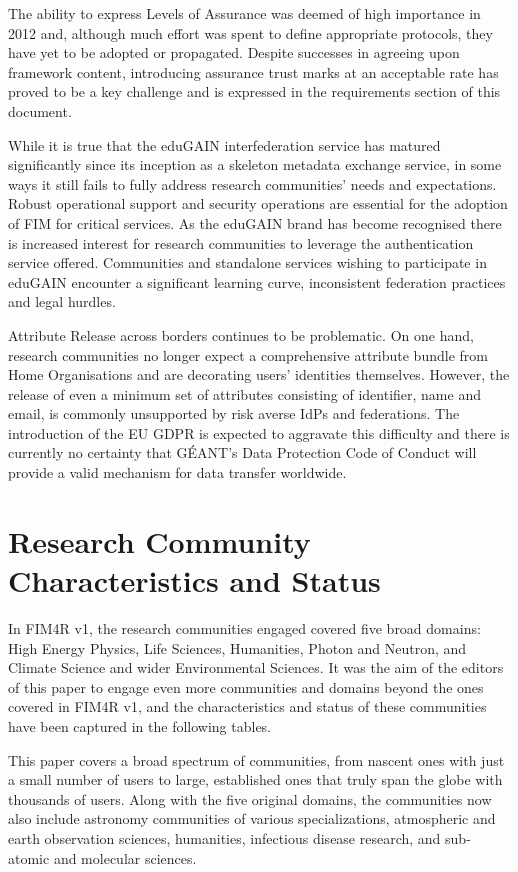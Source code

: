 \documentclass[fleqn,10pt]{wlscirep}
\begin{document}
{The ability to express Levels of Assurance was deemed of high importance in 2012 and, although much effort was spent to define appropriate protocols, they have yet to be adopted or propagated. Despite successes in agreeing upon framework content, introducing assurance trust marks at an acceptable rate has proved to be a key challenge and is expressed in the requirements section of this document.

While it is true that the eduGAIN interfederation service has matured significantly since its inception as a skeleton metadata exchange service, in some ways it still fails to fully address research communities’ needs and expectations. Robust operational support and security operations are essential for the adoption of FIM for critical services. As the eduGAIN brand has become recognised there is increased interest for research communities to leverage the authentication service offered. Communities and standalone services wishing to participate in eduGAIN encounter a significant learning curve, inconsistent federation practices and legal hurdles.

Attribute Release across borders continues to be problematic. On one hand, research communities no longer expect a comprehensive attribute bundle from Home Organisations and are decorating users’ identities themselves. However, the release of even a minimum set of attributes consisting of identifier, name and email, is commonly unsupported by risk averse IdPs and federations. The introduction of the EU GDPR is expected to aggravate this difficulty and there is currently no certainty that GÉANT’s Data Protection Code of Conduct\cite{dpcoco} will provide a valid mechanism for data transfer worldwide.

\section{Research Community Characteristics and Status}
In FIM4R v1, the research communities engaged covered five broad domains: High Energy Physics, Life Sciences, Humanities, Photon and Neutron, and Climate Science and wider Environmental Sciences. It was the aim of the editors of this paper to engage even more communities and domains beyond the ones covered in FIM4R v1, and the characteristics and status of these communities have been captured in the following tables. 

This paper covers a broad spectrum of communities, from nascent ones with just a small number of users to large, established ones that truly span the globe with thousands of users. Along with the five original domains, the communities now also include astronomy communities of various specializations, atmospheric and earth observation sciences, humanities, infectious disease research, and sub-atomic and molecular sciences.

}
\end{document}

